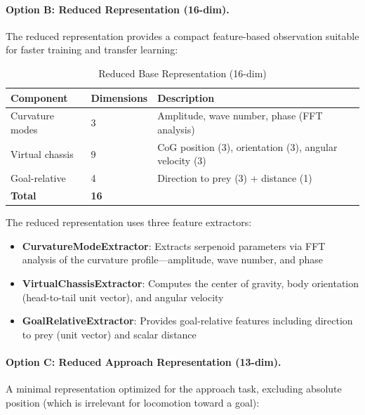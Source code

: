 \documentclass[11pt]{article}
\begin{document}
\paragraph{Option B: Reduced Representation (16-dim).}
The reduced representation provides a compact feature-based observation suitable for faster training and transfer learning:

\begin{table}[H]
\centering
\caption{Reduced Base Representation (16-dim)}
\begin{tabular}{@{}lll@{}}
\toprule
\textbf{Component} & \textbf{Dimensions} & \textbf{Description} \\
\midrule
Curvature modes & 3 & Amplitude, wave number, phase (FFT analysis) \\
Virtual chassis & 9 & CoG position (3), orientation (3), angular velocity (3) \\
Goal-relative & 4 & Direction to prey (3) + distance (1) \\
\midrule
\textbf{Total} & \textbf{16} & \\
\bottomrule
\end{tabular}
\end{table}

The reduced representation uses three feature extractors:
\begin{itemize}
    \item \textbf{CurvatureModeExtractor}: Extracts serpenoid parameters via FFT analysis of the curvature profile---amplitude, wave number, and phase
    \item \textbf{VirtualChassisExtractor}: Computes the center of gravity, body orientation (head-to-tail unit vector), and angular velocity
    \item \textbf{GoalRelativeExtractor}: Provides goal-relative features including direction to prey (unit vector) and scalar distance
\end{itemize}

\paragraph{Option C: Reduced Approach Representation (13-dim).}
A minimal representation optimized for the approach task, excluding absolute position (which is irrelevant for locomotion toward a goal):
\end{document}
